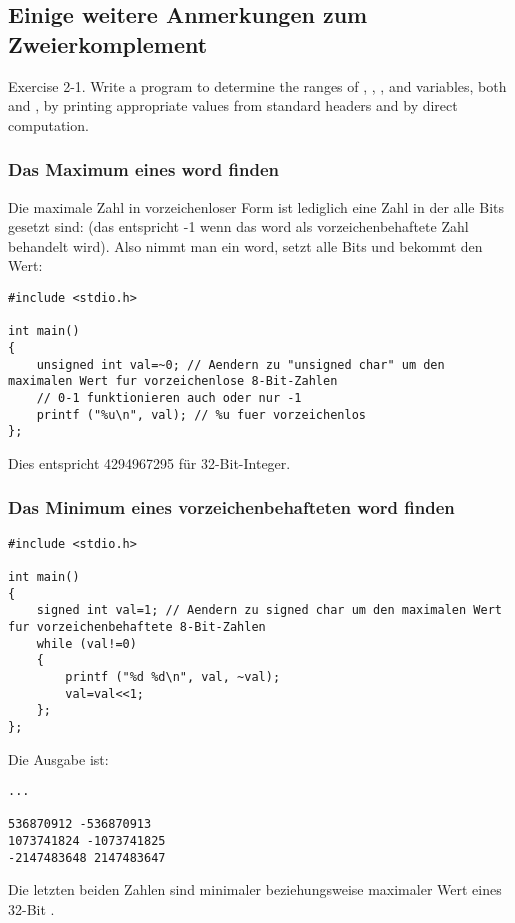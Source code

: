 \subsection{Einige weitere Anmerkungen zum Zweierkomplement}

\epigraph{Exercise 2-1. Write a program to determine the ranges of , , , and 
variables, both  and , by printing appropriate values from standard headers
and by direct computation.}{\KRBook}

\subsubsection{Das Maximum eines \gls{word} finden}
Die maximale Zahl in vorzeichenloser Form ist lediglich eine Zahl in der alle
Bits gesetzt sind: 
(das entspricht -1 wenn das \gls{word} als vorzeichenbehaftete Zahl behandelt wird).
Also nimmt man ein \gls{word}, setzt alle Bits und bekommt den Wert:

\begin{lstlisting}[style=customc]
#include <stdio.h>

int main()
{
	unsigned int val=~0; // Aendern zu "unsigned char" um den maximalen Wert fur vorzeichenlose 8-Bit-Zahlen
	// 0-1 funktionieren auch oder nur -1
	printf ("%u\n", val); // %u fuer vorzeichenlos
};
\end{lstlisting}

Dies entspricht 4294967295 für 32-Bit-Integer.

\subsubsection{Das Minimum eines vorzeichenbehafteten \gls{word} finden}



\begin{lstlisting}[style=customc]
#include <stdio.h>

int main()
{
	signed int val=1; // Aendern zu signed char um den maximalen Wert fur vorzeichenbehaftete 8-Bit-Zahlen
	while (val!=0)
	{
		printf ("%d %d\n", val, ~val);
		val=val<<1;
	};
};
\end{lstlisting}

Die Ausgabe ist:

\begin{lstlisting}
...

536870912 -536870913
1073741824 -1073741825
-2147483648 2147483647
\end{lstlisting}

Die letzten beiden Zahlen sind minimaler beziehungsweise maximaler Wert eines 32-Bit .
